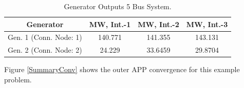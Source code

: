 \documentclass[preprint,12pt,3p]{elsarticle}
\begin{document}
	\begin{table}[ht] 
		
		\caption{Generator Outputs 5 Bus System.} %
		
		\centering %
		
		\begin{tabular}{| c | c | c | c |} %
			
			\hline\hline %
			
			Generator & MW, Int.-1 & MW, Int.-2 & MW, Int.-3 \\ [0.5ex] %
			
			
			\hline %
			
			
			Gen. 1 (Conn. Node: 1) & 140.771 & 141.355 & 143.131 \\ %
			\hline
			Gen. 2 (Conn. Node: 2) & 24.229 & 33.6459 & 29.8704 \\ [1ex] %
			
			\hline %
		\end{tabular} 
		
		\label{table:5LASCOPFGen} %
		
	\end{table}
	\fi
	Figure \ref{SummaryConv} shows the outer APP convergence for this example problem.
	\iffalse
\end{document}
